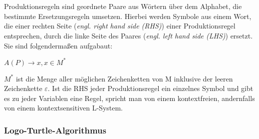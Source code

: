 \\~\\
Produktionsregeln sind geordnete Paare aus Wörtern über dem Alphabet, die bestimmte Ersetzungsregeln umsetzen.
Hierbei werden Symbole aus einem Wort, die einer rechten Seite (\textit{engl. right hand side (RHS)}) einer
Produktionsregel entsprechen, durch die linke Seite des Paares (\textit{engl. left hand side (LHS)}) ersetzt.
Sie sind folgendermaßen aufgabaut:
\begin{center}
    $A(P)\rightarrow x,x\in M^*$
\end{center}
$M^*$ ist die Menge aller möglichen Zeichenketten von M inklusive der leeren Zeichenkette $\varepsilon$.
Ist die RHS jeder Produktionsregel ein einzelnes Symbol und gibt es zu jeder Variablen eine Regel, spricht man
von einem kontextfreien, andernfalls von einem kontextsensitiven L-System.

\subsubsection{Logo-Turtle-Algorithmus}

